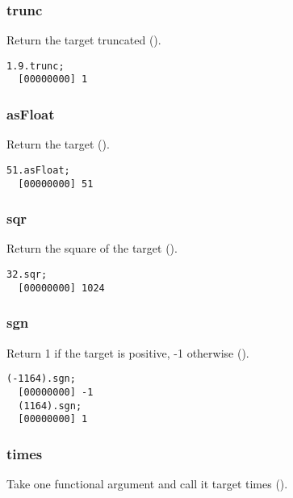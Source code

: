 \subsubsection{trunc}

Return the target truncated  ().

\begin{lstlisting}[caption=Float.trunc, label=lst:float-trunc,
  float=\floatposh]
  1.9.trunc;
  [00000000] 1
\end{lstlisting}

\subsubsection{asFloat}

Return the target ().

\begin{lstlisting}[caption=Float.asFloat, label=lst:float-asFloat,
  float=\floatposh]
  51.asFloat;
  [00000000] 51
\end{lstlisting}

\subsubsection{sqr}

Return the square of the target ().

\begin{lstlisting}[caption=Float.sqr, label=lst:float-sqr,
  float=\floatposh]
  32.sqr;
  [00000000] 1024
\end{lstlisting}

\subsubsection{sgn}

Return 1 if the target is positive, -1 otherwise ().

\begin{lstlisting}[caption=Float.sgn, label=lst:float-sgn,
  float=\floatposh]
  (-1164).sgn;
  [00000000] -1
  (1164).sgn;
  [00000000] 1
\end{lstlisting}

\subsubsection{times}

Take one functional argument and call it target times ().

